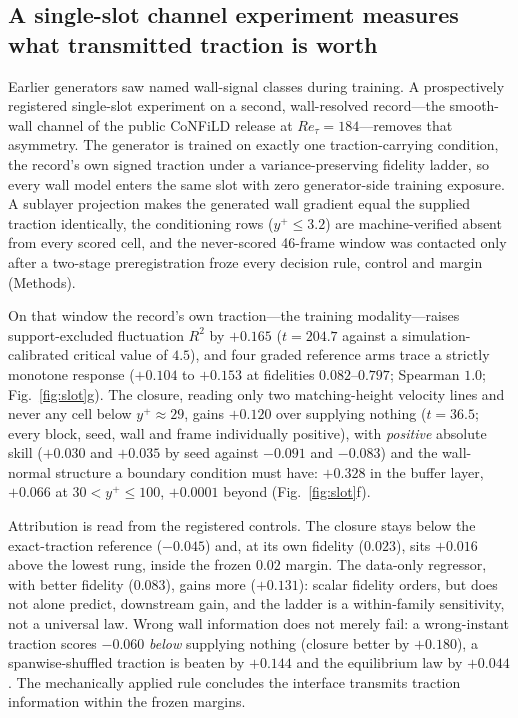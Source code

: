 \subsection{A single-slot channel experiment measures what transmitted traction is worth}
\label{sec:slot}

Earlier generators saw named wall-signal classes during training. A prospectively registered
single-slot experiment on a second, wall-resolved
record---the smooth-wall channel of the public CoNFiLD release at
$Re_\tau=184$---removes that asymmetry. The generator is trained on exactly one
traction-carrying condition, the record's own signed traction under a variance-preserving
fidelity ladder, so every wall model enters the same slot with zero generator-side training
exposure. A sublayer projection makes the generated wall gradient equal the supplied traction
identically, the conditioning rows ($y^+\le3.2$) are machine-verified absent from every scored
cell, and the never-scored 46-frame window was contacted only after a two-stage preregistration
froze every decision rule, control and margin (Methods).

On that window the record's own traction---the training modality---raises support-excluded
fluctuation $R^2$ by $+0.165$ ($t=204.7$ against a simulation-calibrated critical value of
$4.5$), and four graded reference arms trace a strictly monotone response ($+0.104$ to $+0.153$ at
fidelities $0.082$--$0.797$; Spearman $1.0$; Fig.~\ref{fig:slot}g). The closure,
reading only two matching-height velocity lines and never any cell below $y^+\approx29$, gains
$+0.120$ over supplying nothing ($t=36.5$; every block,
seed, wall and frame individually positive), with \emph{positive} absolute skill ($+0.030$
and $+0.035$ by seed against $-0.091$ and $-0.083$) and the wall-normal structure a boundary
condition must have: $+0.328$ in the buffer layer, $+0.066$ at $30<y^+\le100$, $+0.0001$
beyond (Fig.~\ref{fig:slot}f).

Attribution is read from the registered controls. The closure stays below the exact-traction
reference ($-0.045$) and, at its own fidelity ($0.023$), sits $+0.016$ above the lowest rung,
inside the frozen $0.02$ margin. The data-only regressor, with better fidelity ($0.083$), gains
more ($+0.131$): scalar fidelity orders, but does not alone predict, downstream gain, and the
ladder is a within-family sensitivity, not a universal law. Wrong wall information does not
merely fail: a wrong-instant traction scores $-0.060$ \emph{below} supplying nothing (closure
better by $+0.180$), a spanwise-shuffled traction is beaten by $+0.144$ and the equilibrium law
by $+0.044$. The mechanically applied rule concludes the interface transmits traction information
within the frozen margins.

